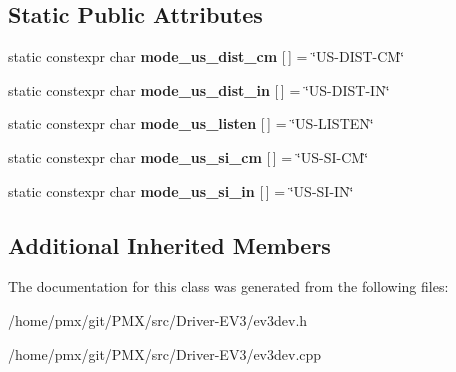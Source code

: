 \subsection*{Static Public Attributes}
\begin{DoxyCompactItemize}
\item 
\mbox{\label{classev3dev_1_1ultrasonic__sensor_a2decba78c0ea814888d7e98835a1d957}} 
static constexpr char {\bfseries mode\+\_\+us\+\_\+dist\+\_\+cm} \mbox{[}$\,$\mbox{]} = \char`\"{}US-\/D\+I\+ST-\/CM\char`\"{}
\item 
\mbox{\label{classev3dev_1_1ultrasonic__sensor_ab55280d94626b7ade4d5fa2a3d95be87}} 
static constexpr char {\bfseries mode\+\_\+us\+\_\+dist\+\_\+in} \mbox{[}$\,$\mbox{]} = \char`\"{}US-\/D\+I\+ST-\/IN\char`\"{}
\item 
\mbox{\label{classev3dev_1_1ultrasonic__sensor_a25445335ce192b6aefb569ab04b4bfdc}} 
static constexpr char {\bfseries mode\+\_\+us\+\_\+listen} \mbox{[}$\,$\mbox{]} = \char`\"{}US-\/L\+I\+S\+T\+EN\char`\"{}
\item 
\mbox{\label{classev3dev_1_1ultrasonic__sensor_a47aaa24f02eb3220c89bac5477ff3f97}} 
static constexpr char {\bfseries mode\+\_\+us\+\_\+si\+\_\+cm} \mbox{[}$\,$\mbox{]} = \char`\"{}US-\/SI-\/CM\char`\"{}
\item 
\mbox{\label{classev3dev_1_1ultrasonic__sensor_a4591461d983df109872887b6ef630a49}} 
static constexpr char {\bfseries mode\+\_\+us\+\_\+si\+\_\+in} \mbox{[}$\,$\mbox{]} = \char`\"{}US-\/SI-\/IN\char`\"{}
\end{DoxyCompactItemize}
\subsection*{Additional Inherited Members}


The documentation for this class was generated from the following files\+:\begin{DoxyCompactItemize}
\item 
/home/pmx/git/\+P\+M\+X/src/\+Driver-\/\+E\+V3/ev3dev.\+h\item 
/home/pmx/git/\+P\+M\+X/src/\+Driver-\/\+E\+V3/ev3dev.\+cpp\end{DoxyCompactItemize}
